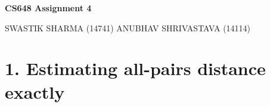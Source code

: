 \documentclass{article}
\begin{document}
\begin{center}
\huge{\textbf{CS648 Assignment 4}}\\
\end{center}
SWASTIK SHARMA (14741)
\hfill
ANUBHAV SHRIVASTAVA (14114)


\section*{1. Estimating all-pairs distance exactly}
\end{document}
